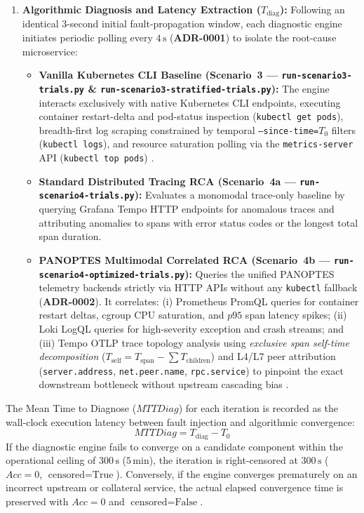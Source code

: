 \begin{enumerate}
    \item \textbf{Algorithmic Diagnosis and Latency Extraction ($T_{\text{diag}}$):} Following an identical 3-second initial fault-propagation window, each diagnostic engine initiates periodic polling every $4\,\text{s}$ (\textbf{ADR-0001}) to isolate the root-cause microservice:
    \begin{itemize}
        \item \textbf{Vanilla Kubernetes CLI Baseline (Scenario~3 --- \texttt{run-scenario3-trials.py} \& \texttt{run-scenario3-stratified-trials.py}):} The engine interacts exclusively with native Kubernetes CLI endpoints, executing container restart-delta and pod-status inspection (\texttt{kubectl get pods}), breadth-first log scraping constrained by temporal \texttt{--since-time=}$T_0$ filters (\texttt{kubectl logs}), and resource saturation polling via the \texttt{metrics-server} API (\texttt{kubectl top pods}) \cite{wang_2024}.
        \item \textbf{Standard Distributed Tracing RCA (Scenario~4a --- \texttt{run-scenario4-trials.py}):} Evaluates a monomodal trace-only baseline by querying Grafana Tempo HTTP endpoints for anomalous traces and attributing anomalies to spans with error status codes or the longest total span duration.
        \item \textbf{PANOPTES Multimodal Correlated RCA (Scenario~4b --- \texttt{run-scenario4-optimized-trials.py}):} Queries the unified PANOPTES telemetry backends strictly via HTTP APIs without any \texttt{kubectl} fallback (\textbf{ADR-0002}). It correlates: (i) Prometheus PromQL queries for container restart deltas, cgroup CPU saturation, and $p95$ span latency spikes; (ii) Loki LogQL queries for high-severity exception and crash streams; and (iii) Tempo OTLP trace topology analysis using \textit{exclusive span self-time decomposition} ($T_{\text{self}} = T_{\text{span}} - \sum T_{\text{children}}$) and L4/L7 peer attribution (\texttt{server.address}, \texttt{net.peer.name}, \texttt{rpc.service}) to pinpoint the exact downstream bottleneck without upstream cascading bias \cite{barata_2026}.
    \end{itemize}
\end{enumerate}

The Mean Time to Diagnose ($MTTDiag$) for each iteration is recorded as the wall-clock execution latency between fault injection and algorithmic convergence:
\begin{equation}
    MTTDiag = T_{\text{diag}} - T_0
\end{equation}
If the diagnostic engine fails to converge on a candidate component within the operational ceiling of $300\,\text{s}$ ($5\,\text{min}$), the iteration is right-censored at $300\,\text{s}$ ($Acc = 0$, $\text{censored} = \text{True}$). Conversely, if the engine converges prematurely on an incorrect upstream or collateral service, the actual elapsed convergence time is preserved with $Acc = 0$ and $\text{censored} = \text{False}$.




